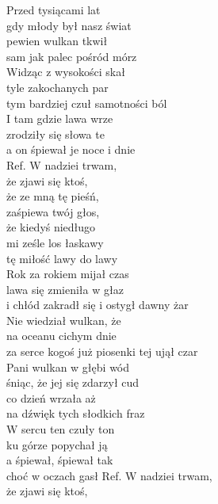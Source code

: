\begin{flushleft}
Przed tysiącami lat\\
gdy młody był nasz świat\\
pewien wulkan tkwił\\
sam jak palec pośród mórz\\
Widząc z wysokości skał\\
tyle zakochanych par\\
tym bardziej czuł samotności ból\\
I tam gdzie lawa wrze\\
zrodziły się słowa te\\
a on śpiewał je noce i dnie\\
\hop
Ref. W nadziei trwam,\\
\hspace{0.9cm}że zjawi się ktoś,\\
\hspace{0.9cm}że ze mną tę pieśń,\\
\hspace{0.9cm}zaśpiewa twój głos,\\
\hspace{0.9cm}że kiedyś niedługo\\
\hspace{0.9cm}mi ześle los łaskawy\\
\hspace{0.9cm}tę miłość lawy do lawy\\
\hop
Rok za rokiem mijał czas\\
lawa się zmieniła w głaz\\
i chłód zakradł się i ostygł dawny żar\\
Nie wiedział wulkan, że \\
na oceanu cichym dnie\\
za serce kogoś już piosenki tej ujął czar\\
Pani wulkan w głębi wód\\
śniąc, że jej się zdarzył cud\\
co dzień wrzała aż\\
na dźwięk tych słodkich fraz\\
W sercu ten czuły ton\\
ku górze popychał ją\\
a śpiewał, śpiewał tak\\
choć w oczach gasł
\hop
Ref. W nadziei trwam,\\
\hspace{0.9cm}że zjawi się ktoś,\\

\end{flushleft}
